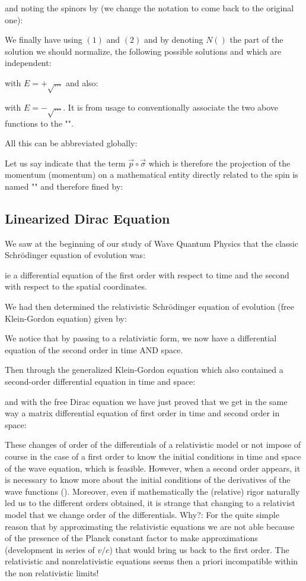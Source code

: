 	and noting the spinors by (we change the notation to come back to the original one):
	
	We finally have using $(1)$ and $(2)$ and by denoting $N()$ the part of the solution we should normalize, the following possible solutions and which are independent:
	
	
	with $E=+\sqrt{\ldots}$ and also:
	
	
	with $E=-\sqrt{\ldots}$. It is from usage to conventionally associate the two above functions to the "".

	All this can be abbreviated globally:
	
	Let us say indicate that the term $\vec{p}\circ\vec{\sigma}$ which is therefore the projection of the momentum (momentum) on a mathematical entity directly related to the spin is named "" and therefore fined by:
	
	
	\subsection{Linearized Dirac Equation}
	We saw at the beginning of our study of Wave Quantum Physics that the classic Schrödinger equation of evolution was:
	
	ie a differential equation of the first order with respect to time and the second with respect to the spatial coordinates.

	We had then determined the relativistic Schrödinger equation of evolution (free Klein-Gordon equation) given by:
	
	We notice that by passing to a relativistic form, we now have a differential equation of the second order in time AND space.

	Then through the generalized Klein-Gordon equation which also contained a second-order differential equation in time and space:
	
	and with the free Dirac equation we have just proved that we get in the same way a matrix differential equation of first order in time and second order in space:
	
	These changes of order of the differentials of a relativistic model or not impose of course in the case of a first order to know the initial conditions in time and space of the wave equation, which is feasible. However, when a second order appears, it is necessary to know more about the initial conditions of the derivatives of the wave functions (). Moreover, even if mathematically the (relative) rigor naturally led us to the different orders obtained, it is strange that changing to a relativist model that we change order of the differentials. Why?: For the quite simple reason that by approximating the relativistic equations we are not able because of the presence of the Planck constant factor to make approximations (development in series of $v/c$) that would bring us back to the first order. The relativistic and nonrelativistic equations seems then a priori incompatible within the non relativistic limits!
	

